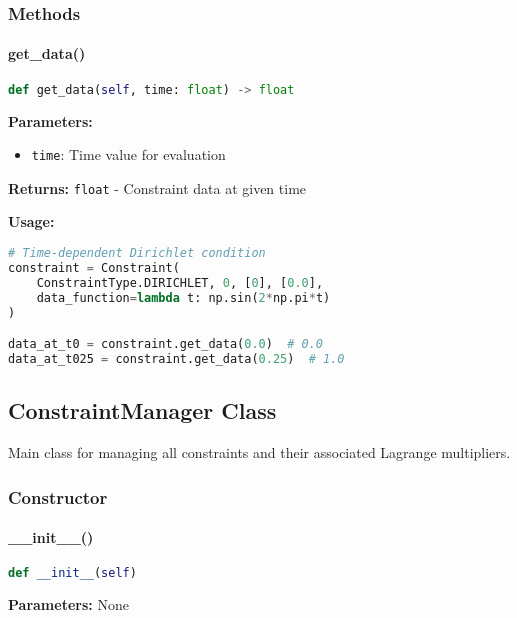 \subsubsection{Methods}

\paragraph{get\_data()}\leavevmode
\begin{lstlisting}[language=Python, caption=Get Data Method]
def get_data(self, time: float) -> float
\end{lstlisting}

\textbf{Parameters:}
\begin{itemize}
    \item \texttt{time}: Time value for evaluation
\end{itemize}

\textbf{Returns:} \texttt{float} - Constraint data at given time

\textbf{Usage:}
\begin{lstlisting}[language=Python, caption=Get Data Usage]
# Time-dependent Dirichlet condition
constraint = Constraint(
    ConstraintType.DIRICHLET, 0, [0], [0.0],
    data_function=lambda t: np.sin(2*np.pi*t)
)

data_at_t0 = constraint.get_data(0.0)  # 0.0
data_at_t025 = constraint.get_data(0.25)  # 1.0
\end{lstlisting}

\subsection{ConstraintManager Class}
\label{subsec:constraint_manager_class}

Main class for managing all constraints and their associated Lagrange multipliers.

\subsubsection{Constructor}

\paragraph{\_\_init\_\_()}\leavevmode
\begin{lstlisting}[language=Python, caption=ConstraintManager Constructor]
def __init__(self)
\end{lstlisting}

\textbf{Parameters:} None

